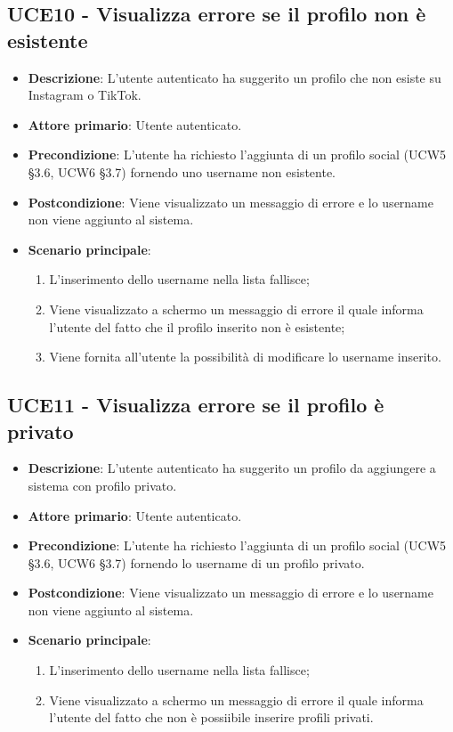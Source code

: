 \subsection{UCE10 - Visualizza errore se il profilo non è esistente}
\begin{itemize}
	\item \textbf{Descrizione}: L'utente autenticato ha suggerito un profilo che non esiste su Instagram o TikTok.
    \item \textbf{Attore primario}: Utente autenticato.
    \item \textbf{Precondizione}: L’utente ha richiesto l’aggiunta di un profilo social (UCW5 §3.6, UCW6 §3.7) fornendo uno username non esistente.
    \item \textbf{Postcondizione}: Viene visualizzato un messaggio di errore e lo username non viene aggiunto al sistema.
    \item \textbf{Scenario principale}: 
    \begin{enumerate}
        \item L'inserimento dello username nella lista fallisce;
        \item Viene visualizzato a schermo un messaggio di errore il quale informa l'utente del fatto che il profilo inserito non è esistente;
        \item Viene fornita all'utente la possibilità di modificare lo username inserito.
    \end{enumerate}
\end{itemize}

\subsection{UCE11 - Visualizza errore se il profilo è privato}
\begin{itemize}
	\item \textbf{Descrizione}: L'utente autenticato ha suggerito un profilo da aggiungere a sistema con profilo privato.
    \item \textbf{Attore primario}: Utente autenticato.
    \item \textbf{Precondizione}: L’utente ha richiesto l’aggiunta di un profilo social (UCW5 §3.6, UCW6 §3.7) fornendo lo username di un profilo privato.
    \item \textbf{Postcondizione}: Viene visualizzato un messaggio di errore e lo username non viene aggiunto al sistema.
    \item \textbf{Scenario principale}: 
    \begin{enumerate}
        \item L'inserimento dello username nella lista fallisce;
        \item Viene visualizzato a schermo un messaggio di errore il quale informa l'utente del fatto che non è possiibile inserire profili privati.
    \end{enumerate}
\end{itemize}

